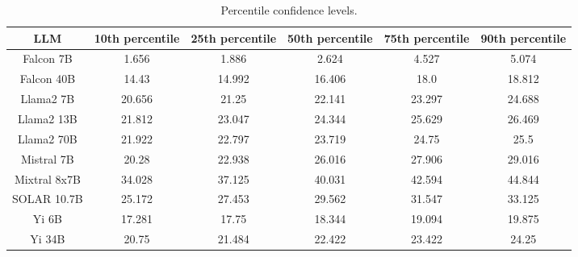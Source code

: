 \begin{table*}
\centering
\begin{tabular}{c|c|c|c|c|c}
LLM & 10th percentile & 25th percentile & 50th percentile & 75th percentile & 90th percentile\\ \hline
Falcon 7B & 1.656 & 1.886 & 2.624 & 4.527 & 5.074\\
Falcon 40B & 14.43 & 14.992 & 16.406 & 18.0 & 18.812\\
Llama2 7B & 20.656 & 21.25 & 22.141 & 23.297 & 24.688\\
Llama2 13B & 21.812 & 23.047 & 24.344 & 25.629 & 26.469\\
Llama2 70B & 21.922 & 22.797 & 23.719 & 24.75 & 25.5\\
Mistral 7B & 20.28 & 22.938 & 26.016 & 27.906 & 29.016\\
Mixtral 8x7B & 34.028 & 37.125 & 40.031 & 42.594 & 44.844\\
SOLAR 10.7B & 25.172 & 27.453 & 29.562 & 31.547 & 33.125\\
Yi 6B & 17.281 & 17.75 & 18.344 & 19.094 & 19.875\\
Yi 34B & 20.75 & 21.484 & 22.422 & 23.422 & 24.25\\
\hline
\end{tabular}
\caption{Percentile confidence levels.}
\label{tab:percentile_conf}
\end{table*}

